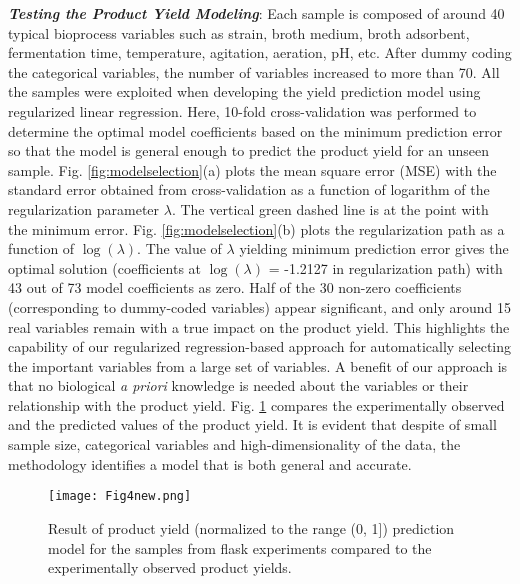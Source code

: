\documentclass{article}
\begin{document}
\noindent \textit{\textbf{Testing the Product Yield Modeling}}:
Each sample is composed of around 40 typical bioprocess variables such as strain, broth medium, broth adsorbent, fermentation time, temperature, agitation, aeration, pH, etc. After dummy coding the categorical variables, the number of variables increased to more than 70. All the samples were exploited when developing the yield prediction model using regularized linear regression. Here, 10-fold cross-validation was performed to determine the optimal model coefficients based on the minimum prediction error so that the model is general enough to predict the product yield for an unseen sample. Fig. \ref{fig:modelselection}(a) plots the mean square error (MSE) with the standard error obtained from cross-validation as a function of logarithm of the regularization parameter $\lambda$. The vertical green dashed line is at the point with the minimum error.  Fig. \ref{fig:modelselection}(b) plots the regularization path as a function of $\log(\lambda)$. The value of $\lambda$ yielding minimum prediction error gives the optimal solution (coefficients at $\log(\lambda)$ = -1.2127 in regularization path) with 43 out of 73 model coefficients as zero. Half of the 30 non-zero coefficients (corresponding to dummy-coded variables) appear significant, and only around 15 real variables remain with a true impact on the product yield. This highlights the capability of our regularized regression-based approach for automatically selecting the important variables from a large set of variables. A benefit of our approach is that no biological \textit{a priori} knowledge is needed about the variables or their relationship with the product yield. %
Fig. \ref{fig:yieldprediction} compares the experimentally observed and the predicted values of the product yield. It is evident that despite of small sample size, categorical variables and high-dimensionality of the data, the methodology identifies a model that is both general and accurate.   

\begin{figure}[b]
\vspace{-3mm}
\begin{minipage}[b]{1.0\linewidth}
  \centering
  \centerline{\texttt{[image: Fig4new.png]}}
  \vspace{-4mm}
\end{minipage}
\caption{Result of product yield (normalized to the range (0, 1]) prediction model for the samples from flask experiments compared to the experimentally observed product yields.}
\label{fig:yieldprediction}
\vspace{-3mm}
\end{figure}
                                                                                    
\end{document}
